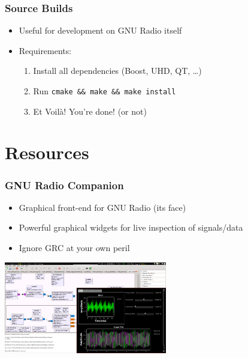\documentclass{beamer}
\begin{document}
\begin{frame}
  \frametitle{Source Builds}
  \begin{itemize}
    \item Useful for development on GNU Radio itself
    \item Requirements:
      \begin{enumerate}
        \item Install all dependencies (Boost, UHD, QT, \ldots)
        \item Run \texttt{cmake \&\& make \&\& make install}
        \item Et Voilà! You're done! (or not)
      \end{enumerate}
  \end{itemize}
\end{frame}

\section{Resources}

\begin{frame}
  \frametitle{GNU Radio Companion}
  \begin{itemize}
    \item Graphical front-end for GNU Radio (its face)
    \item Powerful graphical widgets for live inspection of signals/data
    \item Ignore GRC at your own peril
  \end{itemize}
  \begin{center}
  \includegraphics[height=4cm]{grc}
  \end{center}
\end{frame}
\end{document}
